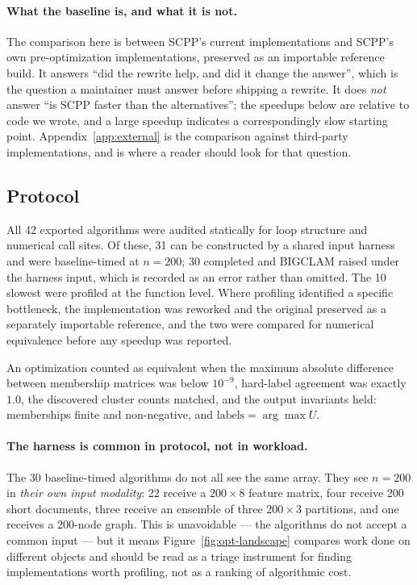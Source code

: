 \documentclass[twoside,11pt]{article}
\begin{document}
\paragraph{What the baseline is, and what it is not.}
The comparison here is between SCPP's current implementations and SCPP's own
pre-optimization implementations, preserved as an importable reference build.
It answers ``did the rewrite help, and did it change the answer'', which is
the question a maintainer must answer before shipping a rewrite. It does
\emph{not} answer ``is SCPP faster than the alternatives''; the speedups
below are relative to code we wrote, and a large speedup indicates a
correspondingly slow starting point. Appendix~\ref{app:external} is the
comparison against third-party implementations, and is where a reader should
look for that question.

\subsection{Protocol}

All 42 exported algorithms were audited statically for loop structure and
numerical call sites. Of these, 31 can be constructed by a shared input
harness and were baseline-timed at $n = 200$; 30 completed and BIGCLAM raised
under the harness input, which is recorded as an error rather than omitted.
The 10 slowest were profiled at the function level. Where profiling
identified a specific bottleneck, the implementation was reworked and the
original preserved as a separately importable reference, and the two were
compared for numerical equivalence before any speedup was reported.

An optimization counted as equivalent when the maximum absolute difference
between membership matrices was below $10^{-9}$, hard-label agreement was
exactly $1.0$, the discovered cluster counts matched, and the output
invariants held: memberships finite and non-negative, and
$\text{labels} = \arg\max U$.

\paragraph{The harness is common in protocol, not in workload.}
The 30 baseline-timed algorithms do not all see the same array. They see
$n = 200$ in \emph{their own input modality}: 22 receive a $200 \times 8$
feature matrix, four receive 200 short documents, three receive an ensemble
of three $200 \times 3$ partitions, and one receives a 200-node graph. This
is unavoidable --- the algorithms do not accept a common input --- but it
means Figure~\ref{fig:opt-landscape} compares work done on different objects
and should be read as a triage instrument for finding implementations worth
profiling, not as a ranking of algorithmic cost.
\end{document}
